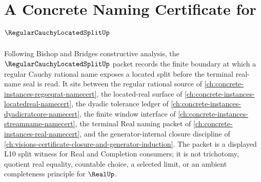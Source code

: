 \chapter{A Concrete Naming Certificate for $\RegularCauchyLocatedSplitUp$}
\label{ch:concrete-instances-regular-cauchy-located-split-namecert}

Following Bishop and Bridges constructive analysis, the $\RegularCauchyLocatedSplitUp$ packet records the finite boundary at which a regular Cauchy rational name exposes a located split before the terminal real-name seal is read. It sits between the regular rational source of \autoref{ch:concrete-instances-regseqrat-namecert}, the located-real surface of \autoref{ch:concrete-instances-locatedreal-namecert}, the dyadic tolerance ledger of \autoref{ch:concrete-instances-dyadicratcore-namecert}, the finite window interface of \autoref{ch:concrete-instances-streamname-namecert}, the terminal Real naming packet of \autoref{ch:concrete-instances-real-namecert}, and the generator-internal closure discipline of \autoref{ch:visions-certificate-closure-and-generator-induction}. The packet is a displayed L10 split witness for Real and Completion consumers; it is not trichotomy, quotient real equality, countable choice, a selected limit, or an ambient completeness principle for $\RealUp$.

